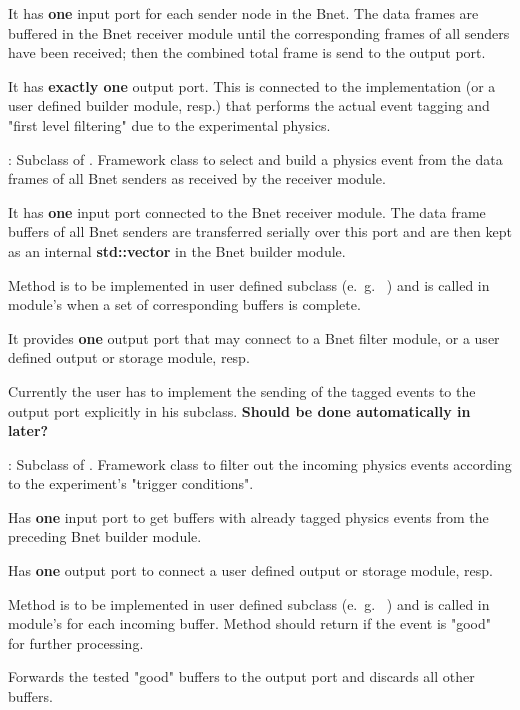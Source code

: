 \begin{description}
\begin{compactenum}
  \item It has {\bf one} input port for each sender node in the Bnet. 
      The data frames are buffered in the Bnet receiver module until the 
      corresponding frames of all senders have been received; then the 
      combined total frame is send to the output port.
  \item It has {\bf exactly one} output port. This is connected to the 
       implementation (or a user defined builder module, resp.) 
      that performs the actual event tagging and "first level filtering" 
      due to the experimental physics.   
\end{compactenum}
\item[\class{bnet::BuilderModule}] : Subclass of . 
   Framework class to select and build a physics event from 
   the data frames of all Bnet senders as received by the receiver module.
\begin{compactenum}
  \item It has {\bf one} input port connected to the Bnet receiver module. 
      The data frame buffers of all Bnet senders are transferred serially 
      over this port and are then kept as an internal {\bf std::vector} in the Bnet builder module.
  \item Method  is to be implemented in user defined 
      subclass (e.~g.~ ) and is called in module's 
       when a set of corresponding buffers is complete.
  \item It provides {\bf one} output port that may connect to a 
      Bnet filter module, or a user defined output or storage module, resp. 
  \item Currently the user has to implement the sending of the tagged 
      events to the output port explicitly in his subclass. 
      {\bf Should be done automatically in  later?}   
\end{compactenum}
\item[\class{bnet::FilterModule}] : Subclass of . 
   Framework class to filter out the incoming physics events 
   according to the experiment's "trigger conditions". 
\begin{compactenum}
  \item Has {\bf one} input port to get buffers with 
      already tagged physics events from the preceding Bnet builder module.
  \item Has {\bf one} output port to connect a user defined output or storage module, resp.
  \item Method  is to be implemented in user 
      defined subclass (e.~g.~ ) and is called in 
      module's  for each incoming buffer. 
      Method should return  if the event is "good" for further processing.
  \item Forwards the tested "good" buffers to the output 
      port and discards all other buffers.
\end{compactenum}
\end{description}